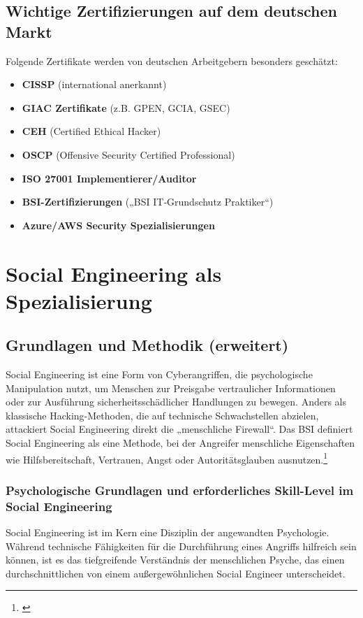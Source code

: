 \documentclass[10pt,a4paper]{article}
\begin{document}
	\subsection{Wichtige Zertifizierungen auf dem deutschen Markt}
	Folgende Zertifikate werden von deutschen Arbeitgebern besonders geschätzt:
	\begin{itemize}
		\item \textbf{CISSP} (international anerkannt)
		\item \textbf{GIAC Zertifikate} (z.B. GPEN, GCIA, GSEC)
		\item \textbf{CEH} (Certified Ethical Hacker)
		\item \textbf{OSCP} (Offensive Security Certified Professional)
		\item \textbf{ISO 27001 Implementierer/Auditor}
		\item \textbf{BSI-Zertifizierungen} („BSI IT‑Grundschutz Praktiker“)
		\item \textbf{Azure/AWS Security Spezialisierungen}
	\end{itemize}
	
	\section{Social Engineering als Spezialisierung}
	
	\subsection{Grundlagen und Methodik (erweitert)}
	Social Engineering ist eine Form von Cyberangriffen, die psychologische Manipulation nutzt, um Menschen zur Preisgabe vertraulicher Informationen oder zur Ausführung sicherheitsschädlicher Handlungen zu bewegen. Anders als klassische Hacking-Methoden, die auf technische Schwachstellen abzielen, attackiert Social Engineering direkt die „menschliche Firewall“. Das BSI definiert Social Engineering als eine Methode, bei der Angreifer menschliche Eigenschaften wie Hilfsbereitschaft, Vertrauen, Angst oder Autoritätsglauben ausnutzen.\footnote{\cite{BSI:SE}}
	
	\subsubsection{Psychologische Grundlagen und erforderliches Skill-Level im Social Engineering}
	Social Engineering ist im Kern eine Disziplin der angewandten Psychologie. Während technische Fähigkeiten für die Durchführung eines Angriffs hilfreich sein können, ist es das tiefgreifende Verständnis der menschlichen Psyche, das einen durchschnittlichen von einem außergewöhnlichen Social Engineer unterscheidet.
	
\end{document}

